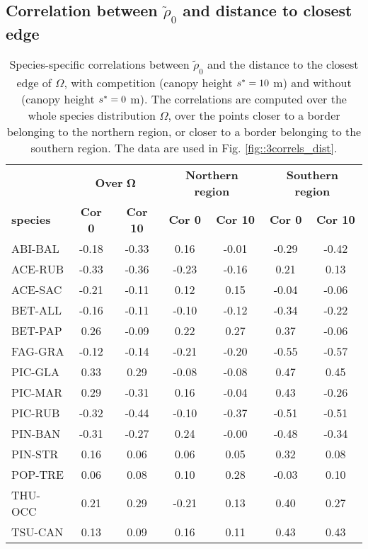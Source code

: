 \begin{refsection}
\subsection{Correlation between $ \tilde \rho_0 $ and distance to closest edge}
\begin{table}[ht]
\centering
\caption{Species-specific correlations between $ \tilde \rho_0 $ and the distance to the closest edge of $ \Omega $, with competition (canopy height $ {s}^{*} = 10 $ m) and without (canopy height $ {s}^{*} = 0 $ m). The correlations are computed over the whole species distribution $ \Omega $, over the points closer to a border belonging to the northern region, or closer to a border belonging to the southern region. The data are used in Fig. \ref{fig::3correls_dist}. \label{tab::R0correl_dist}}
\begin{tabular}{lcccccc}
	\toprule
	~ & \multicolumn{2}{c}{\textbf{Over} $ \bm \Omega $} & \multicolumn{2}{c}{\textbf{Northern region}} & \multicolumn{2}{c}{\textbf{Southern region}} \\
		\cmidrule(lr){2-3} \cmidrule(lr){4-5} \cmidrule(lr){6-7}
		\textbf{species} & \textbf{Cor 0} & \textbf{Cor 10} & \textbf{Cor 0} & \textbf{Cor 10} & \textbf{Cor 0} & \textbf{Cor 10} \\
	\midrule
		ABI-BAL & -0.18 & -0.33 & 0.16 & -0.01 & -0.29 & -0.42 \\
		ACE-RUB & -0.33 & -0.36 & -0.23 & -0.16 & 0.21 & 0.13 \\
		ACE-SAC & -0.21 & -0.11 & 0.12 & 0.15 & -0.04 & -0.06 \\
		BET-ALL & -0.16 & -0.11 & -0.10 & -0.12 & -0.34 & -0.22 \\
		BET-PAP & 0.26 & -0.09 & 0.22 & 0.27 & 0.37 & -0.06 \\
		FAG-GRA & -0.12 & -0.14 & -0.21 & -0.20 & -0.55 & -0.57 \\
		PIC-GLA & 0.33 & 0.29 & -0.08 & -0.08 & 0.47 & 0.45 \\
		PIC-MAR & 0.29 & -0.31 & 0.16 & -0.04 & 0.43 & -0.26 \\
		PIC-RUB & -0.32 & -0.44 & -0.10 & -0.37 & -0.51 & -0.51 \\
		PIN-BAN & -0.31 & -0.27 & 0.24 & -0.00 & -0.48 & -0.34 \\
		PIN-STR & 0.16 & 0.06 & 0.06 & 0.05 & 0.32 & 0.08 \\
		POP-TRE & 0.06 & 0.08 & 0.10 & 0.28 & -0.03 & 0.10 \\
		THU-OCC & 0.21 & 0.29 & -0.21 & 0.13 & 0.40 & 0.27 \\
		TSU-CAN & 0.13 & 0.09 & 0.16 & 0.11 & 0.43 & 0.43 \\
 	\bottomrule
\end{tabular}
\end{table}


\end{refsection}
